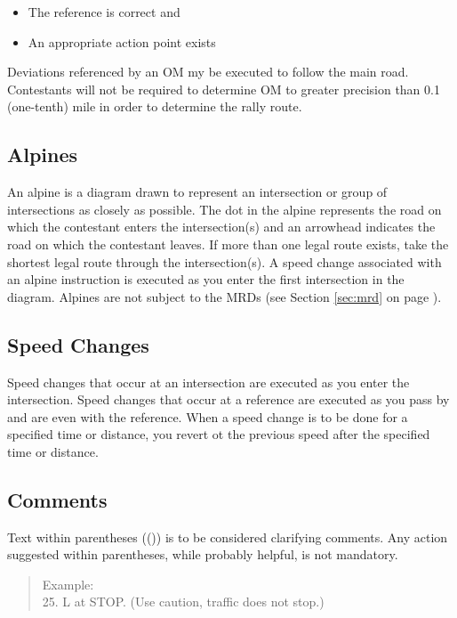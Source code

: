 \begin{itemize}

\item The reference is correct and

\item An appropriate action point exists

\end{itemize}

Deviations referenced by an OM my be executed to follow the main road.  Contestants will not be required to determine OM to greater precision than 0.1 (one-tenth) mile in order to determine the rally route.

\subsection{Alpines}
An alpine is a diagram drawn to represent an intersection or group of intersections as closely as possible.  The dot in the alpine represents the road on which the contestant enters the intersection(s) and an arrowhead indicates the road on which the contestant leaves.  If more than one legal route exists, take the shortest legal route through the intersection(s).  A speed change associated with an alpine instruction is executed as you enter the first intersection in the diagram.  Alpines are not subject to the MRDs (see Section \ref{sec:mrd} on page \pageref{sec:mrd}).


\subsection{Speed Changes}
Speed changes that occur at an intersection are executed as you enter the intersection.  Speed changes that occur at a reference are executed as you pass by and are even with the reference.  When a speed change is to be done for a specified time or distance, you revert ot the previous speed after the specified time or distance.

\subsection{Comments}
Text within parentheses (()) is to be considered clarifying comments.  Any action suggested within parentheses, while probably helpful, is not mandatory.

\begin{quote}
Example:\\
25. L at STOP. (Use caution, traffic does not stop.)
\end{quote}